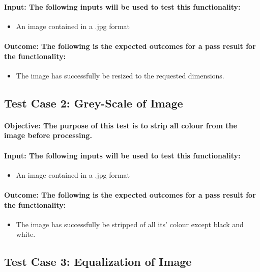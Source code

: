 \documentclass[a4paper,12pt]{report}
\begin{document}
	\paragraph{Input: The following inputs will be used to test this functionality:}
		\begin{itemize}
			\item An image contained in a .jpg format
		\end{itemize}
	\paragraph{Outcome: The following is the expected outcomes for a pass result for the functionality:}
		\begin{itemize}
			\item The image has successfully be resized to the requested dimensions.
		\end{itemize}
		
	\subsection{Test Case 2: Grey-Scale of Image}
	\paragraph{Objective: The purpose of this test is to strip all colour from the image before processing.}
	\paragraph{Input: The following inputs will be used to test this functionality:}
	\begin{itemize}
		\item An image contained in a .jpg format
	\end{itemize}
	\paragraph{Outcome: The following is the expected outcomes for a pass result for the functionality:}
	\begin{itemize}
		\item The image has successfully be stripped of all its' colour except black and white.
	\end{itemize}	
		
	\subsection{Test Case 3: Equalization of Image}
\end{document}
